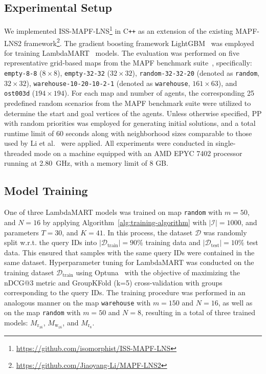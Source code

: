 \documentclass[runningheads]{llncs}
\begin{document}
\subsection{Experimental Setup}

We implemented ISS-MAPF-LNS\footnote{\url{https://github.com/isomorphist/ISS-MAPF-LNS}} in C\texttt{++} as an extension of the existing MAPF-LNS2 framework\footnote{\url{https://github.com/Jiaoyang-Li/MAPF-LNS2}}. The gradient boosting framework LightGBM~\cite{lightgbm-2017} was employed for training LambdaMART~\cite{burges-2010} models. The evaluation was performed on five representative grid-based maps from the MAPF benchmark suite~\cite{stern-2019}, specifically: \texttt{empty-8-8} ($8 \times 8$), \texttt{empty-32-32} ($32 \times 32$), \texttt{random-32-32-20} (denoted as \texttt{random}, $32 \times 32$), \texttt{warehouse-10-20-10-2-1} (denoted as \texttt{warehouse}, $161 \times 63$), and \texttt{ost003d} ($194 \times 194$). For each map and number of agents, the corresponding 25 predefined random scenarios from the MAPF benchmark suite were utilized to determine the start and goal vertices of the agents. Unless otherwise specified, PP with random priorities was employed for generating initial solutions, and a total runtime limit of 60 seconds along with neighborhood sizes comparable to those used by Li et al.~\cite{li-2021} were applied. All experiments were conducted in single-threaded mode on a machine equipped with an AMD EPYC 7402 processor running at 2.80~GHz, with a memory limit of 8 GB.


\subsection{Model Training}

One of three LambdaMART models was trained on map \texttt{random} with $m=50$, and $N=16$ by applying Algorithm~\ref{alg:training-algorithm} with $|\mathcal{I}| = 1000$, and parameters $T=30$, and $K=41$. In this process, the dataset $\mathcal{D}$ was randomly split w.r.t. the query IDs into $|\mathcal{D}_{\mathrm{train}}|=90\%$ training data and $|\mathcal{D}_{\mathrm{test}}|=10\%$ test data. This ensured that samples with the same query IDs were contained in the same dataset. Hyperparameter tuning for LambdaMART was conducted on the training dataset $\mathcal{D}_{\mathrm{train}}$ using Optuna~\cite{optuna-2019} with the objective of maximizing the nDCG@3 metric and GroupKFold (k=5) cross-validation with groups corresponding to the query IDs. The training procedure was performed in an analogous manner on the map \texttt{warehouse} with $m=150$ and $N=16$, as well as on the map \texttt{random} with $m=50$ and $N=8$, resulting in a total of three trained models: $M_{\mathrm{r}_{16}}$, $M_{\mathrm{w}_{16}}$, and $M_{\mathrm{r}_8}$.
\end{document}
